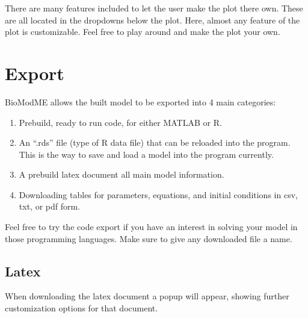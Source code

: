 \documentclass[letterpaper,10pt,english]{sphinxmanual}
\begin{document}
\sphinxAtStartPar
There are many features included to let the user make the plot there own.
These are all located in the dropdowns below the plot.
Here, almost any feature of the plot is customizable.
Feel free to play around and make the plot your own.


\section{Export}
\label{\detokenize{pages/tutorial_sc/3_export:export}}\label{\detokenize{pages/tutorial_sc/3_export::doc}}
\sphinxAtStartPar
BioModME allows the built model to be exported into 4 main categories:
\begin{enumerate}
%
\item {} 
\sphinxAtStartPar
Prebuild, ready to run code, for either MATLAB or R.

\item {} 
\sphinxAtStartPar
An “.rds” file (type of R data file) that can be reloaded into the program.
This is the way to save and load a model into the program currently.

\item {} 
\sphinxAtStartPar
A prebuild latex document all main model information.

\item {} 
\sphinxAtStartPar
Downloading tables for parameters, equations, and initial conditions in csv,
txt, or pdf form.

\end{enumerate}

\begin{figure}[htbp]
\centering

\noindent{}
\end{figure}

\sphinxAtStartPar
Feel free to try the code export if you have an interest in solving your
model in those programming languages.  Make sure to give any downloaded file
a name.


\subsection{Latex}
\label{\detokenize{pages/tutorial_sc/3_export:latex}}
\sphinxAtStartPar
When downloading the latex document a popup will appear, showing
further customization options for that document.

\begin{figure}[htbp]
\centering

\noindent{}
\end{figure}
\end{document}
